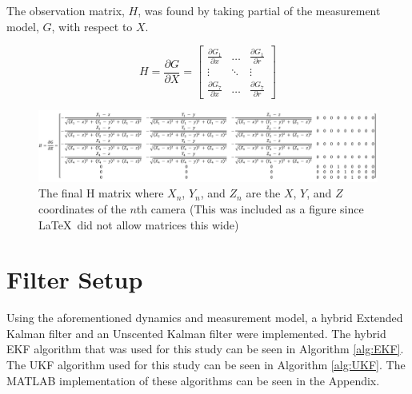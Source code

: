 \documentclass[letterpaper, preprint, paper,11pt]{AAS}	%
\begin{document}
The observation matrix, $H$, was found by taking partial of the measurement model, $G$, with respect to $X$.

\begin{equation}
\label{eq:H}
H = \frac{\partial G}{\partial X} =
\begin{bmatrix} 
    \frac{\partial G_1}{\partial x} & \dots  & \frac{\partial G_1}{\partial r}\\
    \vdots & \ddots & \vdots\\
    \frac{\partial G_{7}}{\partial x} & \dots  & \frac{\partial G_{7}}{\partial r}
\end{bmatrix} 
\end{equation}

\begin{figure}[htb]
	\centering\includegraphics[width=\textwidth]{Figures/HMatrix}
	\caption{The final H matrix where $X_n$, $Y_n$, and $Z_n$ are the $X$, $Y$, and $Z$ coordinates of the $n$th camera (This was included as a figure since \LaTeX\ did not allow matrices this wide)}
	\label{fig:HMatrix}
\end{figure}

\section{Filter Setup}

Using the aforementioned dynamics and measurement model, a hybrid Extended Kalman filter and an Unscented Kalman filter were implemented. The hybrid EKF algorithm that was used for this study can be seen in Algorithm \ref{alg:EKF}. The UKF algorithm used for this study can be seen in Algorithm \ref{alg:UKF}. The MATLAB implementation of these algorithms can be seen in the Appendix.
\end{document}
